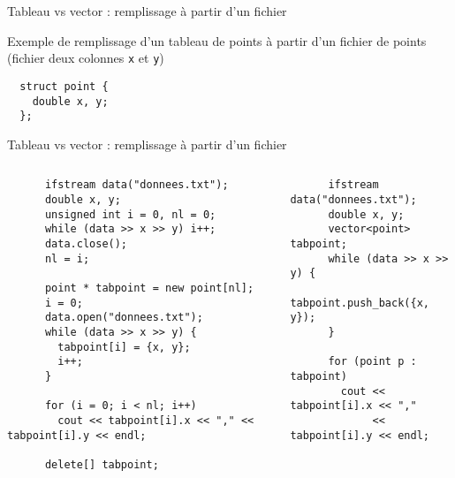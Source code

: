 \documentclass[c]{beamer}
\begin{document}

\begin{frame}[fragile]{Tableau vs vector : remplissage à partir d'un fichier}

Exemple de remplissage d'un tableau de points à partir d'un fichier de points (fichier deux colonnes \texttt{x} et \texttt{y})
  
\begin{verbatim}
  struct point {
    double x, y;
  };
\end{verbatim}

\end{frame}

\begin{frame}[fragile]{Tableau vs vector : remplissage à partir d'un fichier}

  \begin{columns}[t]
    \hspace{-0.8cm} 
    \begin{column}{0.6\textwidth}
      \begin{verbatim}
      ifstream data("donnees.txt");
      double x, y;
      unsigned int i = 0, nl = 0;
      while (data >> x >> y) i++;
      data.close();
      nl = i;

      point * tabpoint = new point[nl];
      i = 0;
      data.open("donnees.txt");
      while (data >> x >> y) {
        tabpoint[i] = {x, y};
        i++;
      }

      for (i = 0; i < nl; i++)
        cout << tabpoint[i].x << "," << tabpoint[i].y << endl;

      delete[] tabpoint;
      \end{verbatim}
    \end{column}
    \pause
    \hspace{-0.6cm} 
    \begin{column}{0.6\textwidth}
      \begin{verbatim}
      ifstream data("donnees.txt");
      double x, y;
      vector<point> tabpoint;
      while (data >> x >> y) {
        tabpoint.push_back({x, y});
      }

      for (point p : tabpoint)
        cout << tabpoint[i].x << ","
             << tabpoint[i].y << endl;
      \end{verbatim}
    \end{column}
  \end{columns}
\end{frame}
\end{document}
